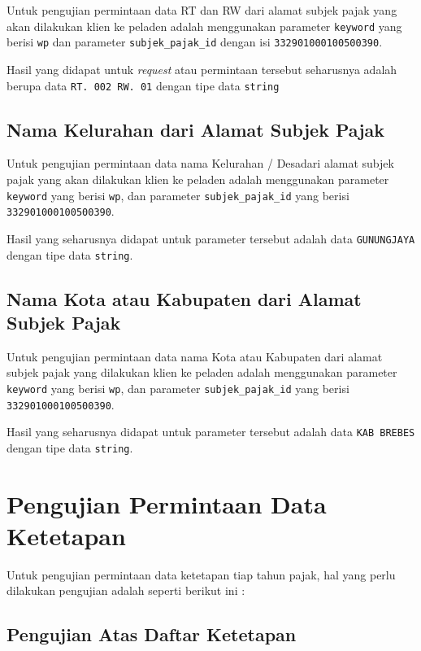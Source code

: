Untuk pengujian permintaan data RT dan RW dari alamat subjek pajak yang akan dilakukan klien ke peladen adalah menggunakan parameter \texttt{keyword} yang berisi \texttt{wp} dan parameter \texttt{subjek\_pajak\_id} dengan isi \texttt{332901000100500390}.

Hasil yang didapat untuk \textit{request} atau permintaan tersebut seharusnya adalah berupa data \texttt{RT. 002 RW. 01} dengan tipe data \texttt{string}

\subsection{Nama Kelurahan dari Alamat Subjek Pajak}

Untuk pengujian permintaan data nama Kelurahan / Desadari alamat subjek pajak yang akan dilakukan klien ke peladen adalah menggunakan parameter \texttt{keyword} yang berisi \texttt{wp}, dan parameter \texttt{subjek\_pajak\_id} yang berisi \texttt{332901000100500390}.

Hasil yang seharusnya didapat untuk parameter tersebut adalah data \texttt{GUNUNGJAYA} dengan tipe data \texttt{string}.

\subsection{Nama Kota atau Kabupaten dari Alamat Subjek Pajak}

Untuk pengujian permintaan data nama Kota atau Kabupaten dari alamat subjek pajak yang dilakukan klien ke peladen adalah menggunakan parameter \texttt{keyword} yang berisi \texttt{wp}, dan parameter \texttt{subjek\_pajak\_id} yang berisi \texttt{332901000100500390}.

Hasil yang seharusnya didapat untuk parameter tersebut adalah data \texttt{KAB BREBES} dengan tipe data \texttt{string}.

\section{Pengujian Permintaan Data Ketetapan}

Untuk pengujian permintaan data ketetapan tiap tahun pajak, hal yang perlu dilakukan pengujian adalah seperti berikut ini :

\subsection{Pengujian Atas Daftar Ketetapan}

